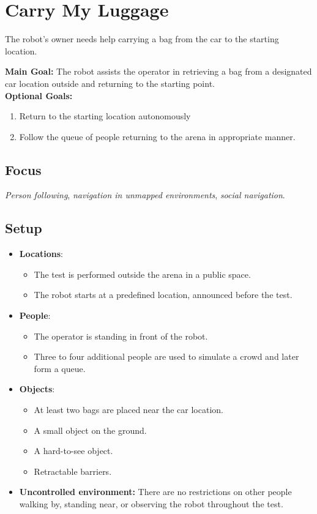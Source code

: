 \section{Carry My Luggage}
\label{test:carry-my-luggage}

The robot's owner needs help carrying a bag from the car to the starting location.

\noindent \textbf{Main Goal:} The robot assists the operator in retrieving a bag from a designated car location outside and returning to the starting point.\\

\noindent \textbf{Optional Goals:}
\begin{enumerate}[nosep]
	\item Return to the starting location autonomously
	\item Follow the queue of people returning to the arena in appropriate manner.
\end{enumerate}

\subsection*{Focus}
\emph{Person following}, \emph{navigation in unmapped environments}, \emph{social navigation}.

\subsection*{Setup}
\begin{itemize}[nosep]
	\item \textbf{Locations}: 
		\begin{itemize}
		 \item The test is performed outside the arena in a public space.
		 \item The robot starts at a predefined location, announced before the test.
		\end{itemize}

	\item \textbf{People}:
	\begin{itemize}[nosep]
		\item The operator is standing in front of the robot.
		\item Three to four additional people are used to simulate a crowd and later form a queue.
	\end{itemize}
	
	\item \textbf{Objects}: 
		\begin{itemize}[nosep]
			\item At least two bags are placed near the car location.
			\item A small object on the ground.
			\item A hard-to-see object.
			\item Retractable barriers.
		\end{itemize}
	
	\item \textbf{Uncontrolled environment:} There are no restrictions on other people walking by, standing near, or observing the robot throughout the test.
\end{itemize}

